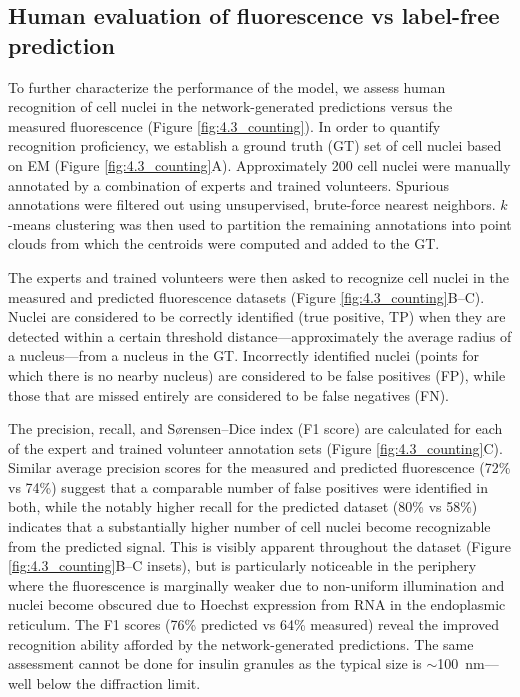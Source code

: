 \subsection{Human evaluation of fluorescence vs label-free prediction}
\label{sec:4results_evaluation}

To further characterize the performance of the model, we assess human recognition of cell nuclei in the network-generated predictions versus the measured fluorescence (Figure \ref{fig:4.3_counting}). In order to quantify recognition proficiency, we establish a ground truth (GT) set of cell nuclei based on EM (Figure \ref{fig:4.3_counting}A). Approximately 200 cell nuclei were manually annotated by a combination of experts and trained volunteers. Spurious annotations were filtered out using unsupervised, brute-force nearest neighbors. $k$-means clustering was then used to partition the remaining annotations into point clouds from which the centroids were computed and added to the GT.

The experts and trained volunteers were then asked to recognize cell nuclei in the measured and predicted fluorescence datasets (Figure \ref{fig:4.3_counting}B--C). Nuclei are considered to be correctly identified (true positive, TP) when they are detected within a certain threshold distance---approximately the average radius of a nucleus---from a nucleus in the GT. Incorrectly identified nuclei (points for which there is no nearby nucleus) are considered to be false positives (FP), while those that are missed entirely are considered to be false negatives (FN).

The precision, recall, and Sørensen–Dice index (F1 score) are calculated for each of the expert and trained volunteer annotation sets (Figure \ref{fig:4.3_counting}C). Similar average precision scores for the measured and predicted fluorescence (72\% vs 74\%) suggest that a comparable number of false positives were identified in both, while the notably higher recall for the predicted dataset (80\% vs 58\%) indicates that a substantially higher number of cell nuclei become recognizable from the predicted signal. This is visibly apparent throughout the dataset (Figure \ref{fig:4.3_counting}B--C insets), but is particularly noticeable in the periphery where the fluorescence is marginally weaker due to non-uniform illumination and nuclei become obscured due to Hoechst expression from RNA in the endoplasmic reticulum. The F1 scores (76\% predicted vs 64\% measured) reveal the improved recognition ability afforded by the network-generated predictions. The same assessment cannot be done for insulin granules as the typical size is {$\sim$}\SI{100}{\nano\meter}---well below the diffraction limit.

